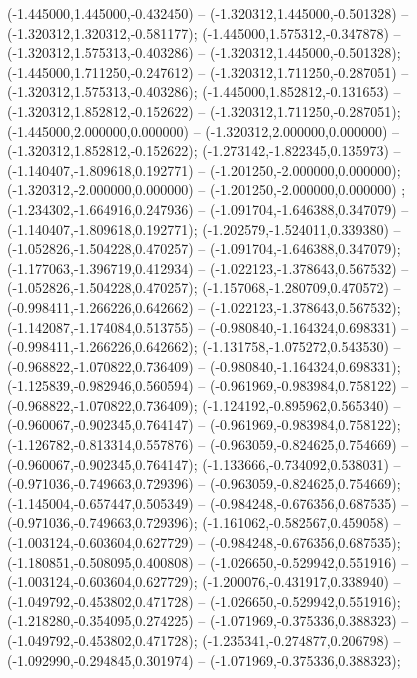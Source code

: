  (-1.445000,1.445000,-0.432450) -- (-1.320312,1.445000,-0.501328) -- (-1.320312,1.320312,-0.581177);
 (-1.445000,1.575312,-0.347878) -- (-1.320312,1.575313,-0.403286) -- (-1.320312,1.445000,-0.501328);
 (-1.445000,1.711250,-0.247612) -- (-1.320312,1.711250,-0.287051) -- (-1.320312,1.575313,-0.403286);
 (-1.445000,1.852812,-0.131653) -- (-1.320312,1.852812,-0.152622) -- (-1.320312,1.711250,-0.287051);
 (-1.445000,2.000000,0.000000) -- (-1.320312,2.000000,0.000000) -- (-1.320312,1.852812,-0.152622);
 (-1.273142,-1.822345,0.135973) -- (-1.140407,-1.809618,0.192771) -- (-1.201250,-2.000000,0.000000);
 (-1.320312,-2.000000,0.000000) -- (-1.201250,-2.000000,0.000000) ;
 (-1.234302,-1.664916,0.247936) -- (-1.091704,-1.646388,0.347079) -- (-1.140407,-1.809618,0.192771);
 (-1.202579,-1.524011,0.339380) -- (-1.052826,-1.504228,0.470257) -- (-1.091704,-1.646388,0.347079);
 (-1.177063,-1.396719,0.412934) -- (-1.022123,-1.378643,0.567532) -- (-1.052826,-1.504228,0.470257);
 (-1.157068,-1.280709,0.470572) -- (-0.998411,-1.266226,0.642662) -- (-1.022123,-1.378643,0.567532);
 (-1.142087,-1.174084,0.513755) -- (-0.980840,-1.164324,0.698331) -- (-0.998411,-1.266226,0.642662);
 (-1.131758,-1.075272,0.543530) -- (-0.968822,-1.070822,0.736409) -- (-0.980840,-1.164324,0.698331);
 (-1.125839,-0.982946,0.560594) -- (-0.961969,-0.983984,0.758122) -- (-0.968822,-1.070822,0.736409);
 (-1.124192,-0.895962,0.565340) -- (-0.960067,-0.902345,0.764147) -- (-0.961969,-0.983984,0.758122);
 (-1.126782,-0.813314,0.557876) -- (-0.963059,-0.824625,0.754669) -- (-0.960067,-0.902345,0.764147);
 (-1.133666,-0.734092,0.538031) -- (-0.971036,-0.749663,0.729396) -- (-0.963059,-0.824625,0.754669);
 (-1.145004,-0.657447,0.505349) -- (-0.984248,-0.676356,0.687535) -- (-0.971036,-0.749663,0.729396);
 (-1.161062,-0.582567,0.459058) -- (-1.003124,-0.603604,0.627729) -- (-0.984248,-0.676356,0.687535);
 (-1.180851,-0.508095,0.400808) -- (-1.026650,-0.529942,0.551916) -- (-1.003124,-0.603604,0.627729);
 (-1.200076,-0.431917,0.338940) -- (-1.049792,-0.453802,0.471728) -- (-1.026650,-0.529942,0.551916);
 (-1.218280,-0.354095,0.274225) -- (-1.071969,-0.375336,0.388323) -- (-1.049792,-0.453802,0.471728);
 (-1.235341,-0.274877,0.206798) -- (-1.092990,-0.294845,0.301974) -- (-1.071969,-0.375336,0.388323);
